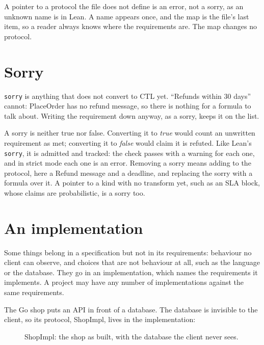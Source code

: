 A pointer to a protocol the file does not define is an error, not a sorry, as an
unknown name is in Lean. A name appears once, and the map is the file's last item, so a
reader always knows where the requirements are. The map changes no protocol.

\section{Sorry}

\texttt{sorry} is anything that does not convert to CTL yet. ``Refunds within 30 days''
cannot: PlaceOrder has no refund message, so there is nothing for a formula to talk
about. Writing the requirement down anyway, as a sorry, keeps it on the list.

A sorry is neither true nor false. Converting it to \emph{true} would count an unwritten
requirement as met; converting it to \emph{false} would claim it is refuted. Like Lean's
\texttt{sorry}, it is admitted and tracked: the check passes with a warning for each one,
and in strict mode each one is an error. Removing a sorry means adding to the protocol, here
a Refund message and a deadline, and replacing the sorry with a formula over it. A pointer
to a kind with no transform yet, such as an SLA block, whose claims are probabilistic, is
a sorry too.

\section{An implementation}

Some things belong in a specification but not in its requirements: behaviour no client
can observe, and choices that are not behaviour at all, such as the language or the
database. They go in an implementation, which names the requirements it implements. A
project may have any number of implementations against the same requirements.

The Go shop puts an API in front of a database. The database is invisible to the client,
so its protocol, ShopImpl, lives in the implementation:



\begin{figure}[ht]\centering
{}
\caption{ShopImpl: the shop as built, with the database the client never sees.}
\label{fig:shopimpl}
\end{figure}

